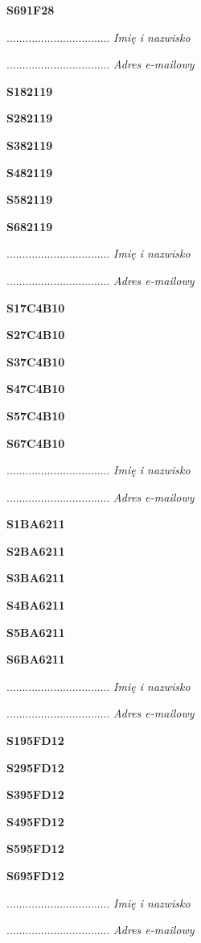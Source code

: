 \Large \textbf{S691F28}

.................................
\textit{Imię i nazwisko}

.................................
\textit{Adres e-mailowy}

\Large \textbf{S182119}

\Large \textbf{S282119}

\Large \textbf{S382119}

\Large \textbf{S482119}

\Large \textbf{S582119}

\Large \textbf{S682119}

.................................
\textit{Imię i nazwisko}

.................................
\textit{Adres e-mailowy}

\Large \textbf{S17C4B10}

\Large \textbf{S27C4B10}

\Large \textbf{S37C4B10}

\Large \textbf{S47C4B10}

\Large \textbf{S57C4B10}

\Large \textbf{S67C4B10}

.................................
\textit{Imię i nazwisko}

.................................
\textit{Adres e-mailowy}

\Large \textbf{S1BA6211}

\Large \textbf{S2BA6211}

\Large \textbf{S3BA6211}

\Large \textbf{S4BA6211}

\Large \textbf{S5BA6211}

\Large \textbf{S6BA6211}

.................................
\textit{Imię i nazwisko}

.................................
\textit{Adres e-mailowy}

\Large \textbf{S195FD12}

\Large \textbf{S295FD12}

\Large \textbf{S395FD12}

\Large \textbf{S495FD12}

\Large \textbf{S595FD12}

\Large \textbf{S695FD12}

.................................
\textit{Imię i nazwisko}

.................................
\textit{Adres e-mailowy}

